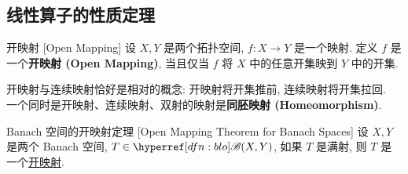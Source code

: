     \subsection{线性算子的性质定理}

        \begin{dfn}
            {开映射}
            [Open Mapping]
            设 \(X, Y\) 是两个拓扑空间, \(f:X\to Y\) 是一个映射. 定义 \(f\) 是一个\textbf{开映射 (Open Mapping)}, 当且仅当 \(f\) 将 \(X\) 中的任意开集映到 \(Y\) 中的开集.
        \end{dfn}

        \begin{rmk}
            开映射与连续映射恰好是相对的概念: 开映射将开集推前, 连续映射将开集拉回. \\
            一个同时是开映射、连续映射、双射的映射是\textbf{同胚映射 (Homeomorphism)}.
        \end{rmk}

        \begin{thm}
            [omt]
            {Banach 空间的开映射定理}
            [Open Mapping Theorem for Banach Spaces]
            设 \(X,Y\) 是两个 Banach 空间, \(T\in\blo(X,Y)\), 如果 \(T\) 是满射, 则 \(T\) 是一个\hyperref[dfn:open-mapping]{开映射}.
        \end{thm}

